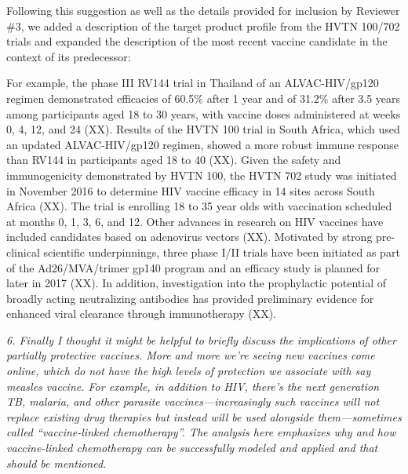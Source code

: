 \documentclass[12pt]{jpmletter}
\newenvironment{original}{\it}{}
\begin{document}
\begin{letter}{}
    Following this suggestion as well as the details provided for
    inclusion by Reviewer \#3, we added a description of the target
    product profile from the HVTN 100/702 trials and expanded the
    description of the most recent vaccine candidate in the context of
    its predecessor:
    \begin{quoting}
      For example, the phase III RV144 trial in Thailand of an
      ALVAC-HIV/gp120 regimen demonstrated efficacies of 60.5\% after
      1 year and of 31.2\% after 3.5 years among participants aged 18
      to 30 years, with vaccine doses administered at weeks 0, 4, 12,
      and 24 (XX). Results of the HVTN 100 trial in South Africa,
      which used an updated ALVAC-HIV/gp120 regimen, showed a more
      robust immune response than RV144 in participants aged 18 to 40
      (XX).  Given the safety and immunogenicity demonstrated by HVTN
      100, the HVTN 702 study was initiated in November 2016 to
      determine HIV vaccine efficacy in 14 sites across South Africa
      (XX). The trial is enrolling 18 to 35 year olds with vaccination
      scheduled at months 0, 1, 3, 6, and 12.  Other advances in
      research on HIV vaccines have included candidates based on
      adenovirus vectors (XX).  Motivated by strong pre-clinical
      scientific underpinnings, three phase I/II trials have been
      initiated as part of the Ad26/MVA/trimer gp140 program and an
      efficacy study is planned for later in 2017 (XX).  In addition,
      investigation into the prophylactic potential of broadly acting
      neutralizing antibodies has provided preliminary evidence for
      enhanced viral clearance through immunotherapy (XX).
    \end{quoting}
    
    \begin{original}
      6. Finally I thought it might be helpful to briefly discuss the
      implications of other partially protective vaccines. More and
      more we're seeing new vaccines come online, which do not have
      the high levels of protection we associate with say measles
      vaccine. For example, in addition to HIV, there's the next
      generation TB, malaria, and other parasite vaccines—increasingly
      such vaccines will not replace existing drug therapies but
      instead will be used alongside them—sometimes called
      ``vaccine-linked chemotherapy''. The analysis here emphasizes
      why and how vaccine-linked chemotherapy can be successfully
      modeled and applied and that should be mentioned.
    \end{original}
    

\end{letter}
\end{document}
